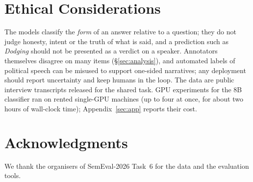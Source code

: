 \section*{Ethical Considerations}

The models classify the \emph{form} of an answer relative to a question; they do not judge honesty, intent or the truth of what is said, and a prediction such as \emph{Dodging} should not be presented as a verdict on a speaker.
Annotators themselves disagree on many items (\S\ref{sec:analysis}), and automated labels of political speech can be misused to support one-sided narratives; any deployment should report uncertainty and keep humans in the loop.
The data are public interview transcripts released for the shared task.
GPU experiments for the 8B classifier ran on rented single-GPU machines (up to four at once, for about two hours of wall-clock time); Appendix~\ref{sec:app} reports their cost.

\section*{Acknowledgments}

We thank the organisers of SemEval-2026 Task~6 for the data and the evaluation tools.

